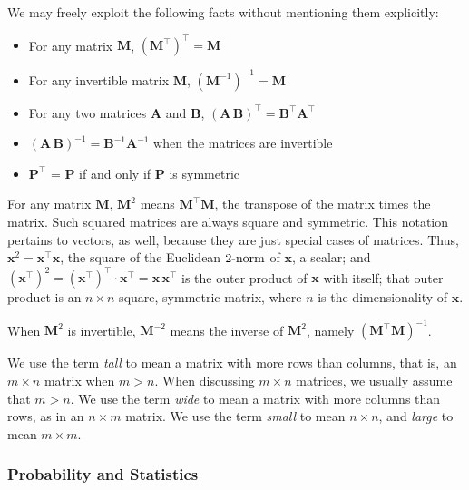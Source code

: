 \documentclass[10pt,oneside,x11names]{article}
\begin{document}
We may freely  exploit the following facts without mentioning them explicitly:
\begin{itemize}
\item For any matrix \(\mathbold{M}\), \(\left(\mathbold{M}^\intercal\right)^\intercal = \mathbold{M}\)
\item For any invertible matrix \(\mathbold{M}\), \(\left(\mathbold{M}^{-1}\right)^{-1} = \mathbold{M}\)
\item For any two matrices \(\mathbold{A}\) and
\(\mathbold{B}\),
\(\left(\mathbold{A}\,\mathbold{B}\right)^\intercal=\mathbold{B}^\intercal\mathbold{A}^\intercal\)
\item \(\left(\mathbold{A}\,\mathbold{B}\right)^{-1}=\mathbold{B}^{-1}\mathbold{A}^{-1}\)
  when the matrices are invertible
\item \(\mathbold{P}^\intercal\) = \(\mathbold{P}\) if and only if \(\mathbold{P}\) is
symmetric
\end{itemize}

For any matrix \(\mathbold{M}\), \(\mathbold{M}^2\) means
\(\mathbold{M}^\intercal\mathbold{M}\), the transpose of the matrix times the
matrix. Such squared matrices are always square and symmetric.
This notation pertains to vectors, as well, because they are just
special cases of matrices. Thus,
\(\mathbold{x}^2=\mathbold{x}^\intercal\mathbold{x}\), the square of the Euclidean
\(\mbox{2-\textrm{norm}}\) of \(\mathbold{x}\), a scalar; and
\((\mathbold{x}^\intercal)^2 =
(\mathbold{x}^\intercal)^\intercal\cdot
\mathbold{x}^\intercal=
\mathbold{x}\,\mathbold{x}^\intercal\)
is the outer product of \(\mathbold{x}\) with itself; that outer product is an
\(n\times{n}\) square, symmetric matrix, where \(n\) is the dimensionality of \(\mathbold{x}\). 



When \(\mathbold{M}^2\) is invertible, \(\mathbold{M}^{-2}\)
means the inverse of \(\mathbold{M}^2\), namely
\(\left(\mathbold{M}^\intercal\mathbold{M}\right)^{-1}\).

We use the term \emph{tall} to mean a matrix with more rows than columns, that is, an
\(m\times{n}\)
matrix when
\(m>n\). When discussing
\(m\times{n}\)
matrices, we  usually assume that
\(m>n\).
We use the term \emph{wide} to mean a matrix with
more columns than rows, as in an \(n\times{m}\) matrix. We use the term \emph{small} to
mean \(n\times{n}\), and \emph{large} to mean \(m\times{m}\). 

\subsubsection{Probability and Statistics}
\label{sec:orgheadline3}
\end{document}
